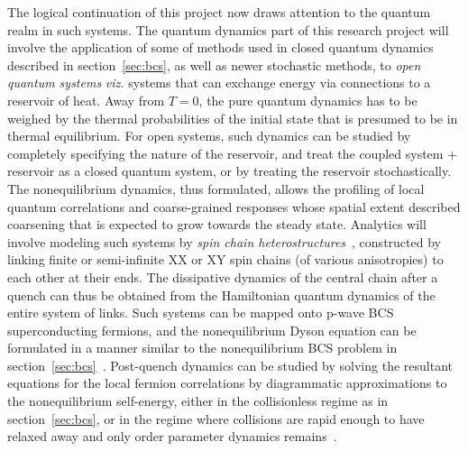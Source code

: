 \documentclass[a4paper,10pt]{report}
\begin{document}
The logical continuation of this project now draws attention to the quantum realm in such systems. The quantum dynamics part of this research project will involve the application of some of methods used in closed quantum dynamics described in section~\ref{sec:bcs}, as well as newer stochastic methods, to \textit{open quantum systems} \textit{viz.} systems that can exchange energy via connections to a reservoir of heat. Away from $T=0$, the pure quantum dynamics has to be weighed by the thermal probabilities of the initial state that is presumed to be in thermal equilibrium. For open systems, such dynamics can be studied by completely specifying the nature of the reservoir, and treat the coupled system + reservoir as a closed 
quantum system, or by treating the reservoir stochastically. The nonequilibrium dynamics, thus formulated, allows the profiling of local quantum correlations and coarse-grained responses whose 
spatial extent described coarsening that is expected to grow towards the steady state. Analytics will involve modeling such systems by \textit{spin chain heterostructures}~\cite{arrachea},  constructed by linking finite or semi-infinite XX or XY spin chains (of various anisotropies) to each other at their ends. The dissipative dynamics of the central chain after a quench can thus be obtained from the Hamiltonian quantum dynamics of the entire system of links. Such systems can be mapped onto p-wave BCS superconducting fermions, and the nonequilibrium Dyson equation can be formulated in a manner similar to the nonequilibrium BCS problem in section~\ref{sec:bcs}~\cite{gorkov:volkov}. Post-quench dynamics can be studied by solving the resultant equations for the local fermion correlations by diagrammatic approximations to the nonequilibrium self-energy, either in the collisionless regime as in section~\ref{sec:bcs}, or in the regime where collisions are rapid enough to have relaxed away and only order parameter dynamics remains~\cite{rammer, colrev,myreview}.
\end{document}

